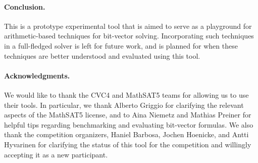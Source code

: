 \documentclass{easychair}
\newcommand{\msat}{MathSAT5\xspace}
\newcommand{\cvcfour}{CVC4\xspace}
\begin{document}
\paragraph{Conclusion.}
This is a prototype experimental tool that is aimed to serve as a
playground for arithmetic-based techniques for bit-vector solving. Incorporating
such techniques in a full-fledged solver is left for future work, and is planned
for when these techniques are better understood and evaluated using this tool.

\paragraph{Acknowledgments.} We would like to thank the \cvcfour and \msat teams for allowing us
to use their tools. In particular, we thank Alberto Griggio
for clarifying the relevant aspects of the \msat license, and to Aina Niemetz
and Mathias Preiner for helpful tips regarding benchmarking and evaluating
bit-vector formulas. We also thank the competition organizers, Haniel Barbosa,
Jochen Hoenicke, and Antti Hyvarinen for clarifying the status of this tool for
the competition and willingly accepting it as a new participant.



  
  
\end{document}
